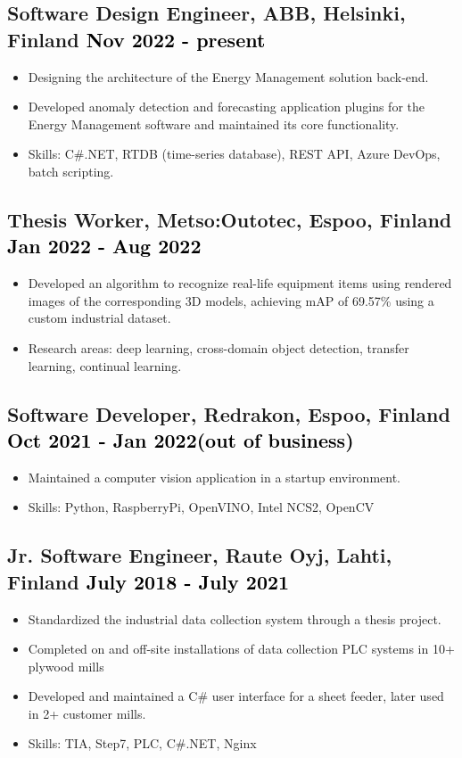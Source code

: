 \documentclass[a4paper,10pt]{article}
\begin{document}
\subsection*{Software Design Engineer, ABB, Helsinki, Finland \hfill \textcolor{black}{Nov 2022 - present}}
\begin{itemize}
    \item Designing the architecture of the Energy Management solution back-end.
    \item Developed anomaly detection and forecasting application plugins for the Energy Management software and maintained its core functionality.
    \item Skills: C\#.NET, RTDB (time-series database), REST API, Azure DevOps, batch scripting.
\end{itemize}

\subsection*{Thesis Worker, Metso:Outotec, Espoo, Finland \hfill \textcolor{black}{Jan 2022 - Aug 2022}}
\begin{itemize}
    \item Developed an algorithm to recognize real-life equipment items using rendered images of the corresponding 3D models, achieving mAP of 69.57\% using a custom industrial dataset.
    \item Research areas: deep learning, cross-domain object detection, transfer learning, continual learning.
\end{itemize}

\subsection*{Software Developer, Redrakon, Espoo, Finland \hfill \textcolor{black}{Oct 2021 - Jan 2022(out of business)}}
\begin{itemize}
    \item Maintained a computer vision application in a startup environment.
    \item Skills: Python, RaspberryPi, OpenVINO, Intel NCS2, OpenCV
\end{itemize}

\subsection*{Jr. Software Engineer, Raute Oyj, Lahti, Finland \hfill \textcolor{black}{July 2018 - July 2021}}
\begin{itemize}
    \item Standardized the industrial data collection system through a thesis project.
    \item Completed on and off-site installations of data collection PLC systems in 10+ plywood mills 
    \item Developed and maintained a C\# user interface for a sheet feeder, later used in 2+ customer mills.
    \item Skills: TIA, Step7, PLC, C\#.NET, Nginx
\end{itemize}
\end{document}
